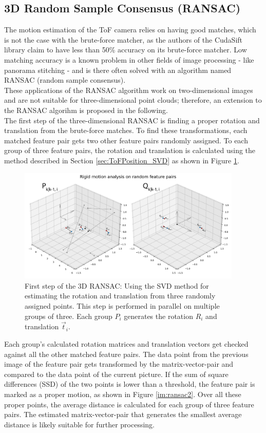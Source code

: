 \subsection{3D Random Sample Consensus (RANSAC)}
\label{sec:ToFPosition_RANSAC}
The motion estimation of the ToF camera relies on having good matches, which is not the case with the brute-force matcher, as the authors of the CudaSift library claim to have less than 50\% accuracy on its brute-force matcher.\cite{cudaSiftRepo} Low matching accuracy is a known problem in other fields of image processing - like panorama stitching - and is there often solved with an algorithm named RANSAC (random sample consensus).\\
These applications of the RANSAC algorithm work on two-dimensional images and are not suitable for three-dimensional point clouds; therefore, an extension to the RANSAC algorihm is proposed in the following.\\
The first step of the three-dimensional RANSAC is finding a proper rotation and translation from the brute-force matches. To find these transformations, each matched feature pair gets two other feature pairs randomly assigned. To each group of three feature pairs, the rotation and translation is calculated using the method described in Section \ref{sec:ToFPosition_SVD} as shown in Figure \ref{im:ransac1}.
\begin{figure}[H]
    \centering
    \includegraphics[width=0.95\textwidth]{images/ransac_3d_step1.pdf}
    \caption{First step of the 3D RANSAC: Using the SVD method for estimating the rotation and translation from three randomly assigned points. This step is performed in parallel on multiple groups of three. Each group $P_{i}$ generates the rotation $R_{i}$ and translation $\vec{t}_{i}$.}
    \label{im:ransac1}
\end{figure}
Each group's calculated rotation matrices and translation vectors get checked against all the other matched feature pairs. The data point from the previous image of the feature pair gets transformed by the matrix-vector-pair and compared to the data point of the current picture. If the sum of square differences (SSD) of the two points is lower than a threshold, the feature pair is marked as a proper motion, as shown in Figure \ref{im:ransac2}. Over all these proper points, the average distance is calculated for each group of three feature pairs. The estimated matrix-vector-pair that generates the smallest average distance is likely suitable for further processing.
